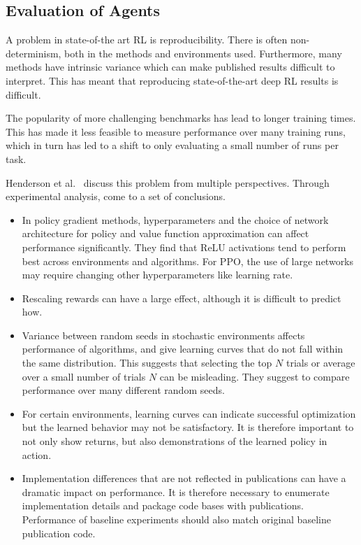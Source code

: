 \subsection{Evaluation of Agents}

A problem in state-of-the art RL is reproducibility.
There is often non-determinism, both in the methods and environments used.
Furthermore, many methods have intrinsic variance which can make published results difficult to interpret.
This has meant that reproducing state-of-the-art deep RL results is difficult.

The popularity of more challenging benchmarks has lead to longer training times.
This has made it less feasible to measure performance over many training runs,
which in turn has led to a shift to only evaluating a small number of runs per task.~\cite{agarwal_rlliable_2022}

Henderson et al.~\cite{henderson_matters_2018} discuss this problem from multiple perspectives.
Through experimental analysis, come to a set of conclusions.

\begin{itemize}
    \item In policy gradient methods, hyperparameters and the choice of network architecture for policy and value function approximation can affect performance significantly.
    They find that ReLU activations tend to perform best across environments and algorithms.
    For PPO, the use of large networks may require changing other hyperparameters like learning rate.
    \item Rescaling rewards can have a large effect, although it is difficult to predict how.
    \item Variance between random seeds in stochastic environments affects performance of algorithms, and give learning curves that do not fall within the same distribution.
    This suggests that selecting the top \(N\) trials or average over a small number of trials \(N\) can be misleading. They suggest to compare performance over many different random seeds.
    \item For certain environments, learning curves can indicate successful optimization but the learned behavior may not be satisfactory.
    It is therefore important to not only show returns, but also demonstrations of the learned policy in action.
    \item Implementation differences that are not reflected in publications can have a dramatic impact on performance.
    It is therefore necessary to enumerate implementation details and package code bases with publications.
    Performance of baseline experiments should also match original baseline publication code.
\end{itemize}

